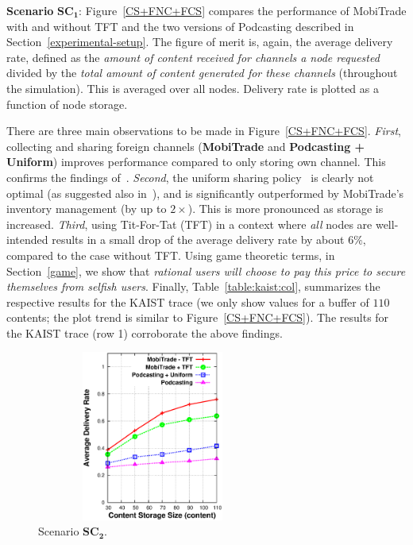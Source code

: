 \noindent \textbf{Scenario} $\mathbf{SC_{1}}$: Figure~\ref{CS+FNC+FCS} compares the performance of MobiTrade with and without TFT and the two versions of Podcasting described in Section~\ref{experimental-setup}. The figure of merit is, again, the average delivery rate, defined as the \emph{amount of content received for channels a node requested} divided by the \emph{total amount of content generated for these channels} (throughout the simulation). This is averaged over all nodes. Delivery rate is plotted as a function of node storage.

There are three main observations to be made in Figure~\ref{CS+FNC+FCS}. \emph{First}, collecting and sharing foreign channels (\textbf{MobiTrade} and \textbf{Podcasting + Uniform}) improves performance compared to only storing own channel. This confirms the findings of~\cite{Podcasting:Secon07}. \emph{Second}, the uniform sharing policy~\cite{Podcasting:Secon07} is clearly not optimal (as suggested also in~\cite{OptimalChannelChoice}), and is significantly outperformed by MobiTrade's inventory management (by up to $2 \times$). This is more pronounced as storage is increased. \emph{Third}, using Tit-For-Tat (TFT) in a context where \emph{all} nodes are well-intended results in a small drop of the average delivery rate by about $6\%$, compared to the case without TFT. Using game theoretic terms, in Section~\ref{game}, we show that \emph{rational users will choose to pay this price to secure themselves from selfish users}. Finally,  Table~\ref{table:kaist:col}, summarizes the respective results for the KAIST trace (we only show values for a buffer of $110$ contents; the plot trend is similar to Figure~\ref{CS+FNC+FCS}). The results for the KAIST trace (row 1) corroborate the above findings.

\begin{figure}[!h]
  \begin{center}
    \includegraphics[width=3in,height=2.2in]{Chapitre5/fig4.eps}
  \end{center}
  \caption{Scenario $\mathbf{SC_2}$.}
  \label{CS+RNC+FCS}
\end{figure}


